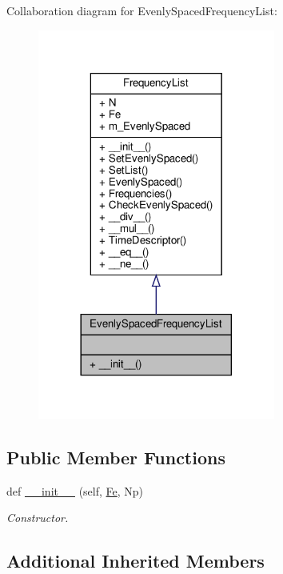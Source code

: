 Collaboration diagram for Evenly\+Spaced\+Frequency\+List\+:\nopagebreak
\begin{figure}[H]
\begin{center}
\leavevmode
\includegraphics[width=221pt]{classSignalIntegrity_1_1FrequencyDomain_1_1FrequencyList_1_1EvenlySpacedFrequencyList__coll__graph}
\end{center}
\end{figure}
\subsection*{Public Member Functions}
\begin{DoxyCompactItemize}
\item 
def \hyperlink{classSignalIntegrity_1_1FrequencyDomain_1_1FrequencyList_1_1EvenlySpacedFrequencyList_a14670857025f1633a7f1db215d83c385}{\+\_\+\+\_\+init\+\_\+\+\_\+} (self, \hyperlink{classSignalIntegrity_1_1FrequencyDomain_1_1FrequencyList_1_1FrequencyList_a7313483ea19e09cf50b8b58d531b871d}{Fe}, Np)
\begin{DoxyCompactList}\small\item\em Constructor. \end{DoxyCompactList}\end{DoxyCompactItemize}
\subsection*{Additional Inherited Members}


